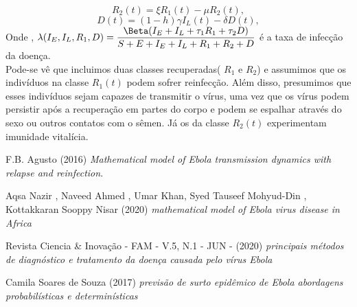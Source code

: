 \documentclass[12pt,a4paper]{article}
\begin{document}
$$R_2(t) = \xi R_1(t) - \mu R_2(t) ,$$
$$D(t) = (1 - h)\gamma I_L(t) - \delta D(t) ,$$
Onde , $\lambda(I_E,I_L,R_1,D) = \dfrac{\Beta (I_E + I_L + \tau_1 R_1 + \tau_2 D)}{S + E + I_E + I_L + R_1 + R_2 + D}$ é a taxa de infecção da doença. \vspace{3mm}\\
Pode-se vê que incluimos duas classes recuperadas( $R_1$ e $R_2$) e assumimos que os indivíduos na classe $R_1(t)$ podem sofrer reinfecção. Além disso, presumimos que esses indivíduos sejam capazes de transmitir o vírus, uma vez que os vírus podem persistir após a recuperação em partes do corpo e podem se espalhar através do sexo ou outros contatos com o sêmen. Já os da classe $R_2(t)$ experimentam imunidade vitalícia.
 
\newpage
\begin{thebibliography}{9}
F.B. Agusto (2016) \emph{Mathematical model of Ebola transmission dynamics with relapse and reinfection}.

Aqsa Nazir , Naveed Ahmed , Umar Khan, Syed Tauseef Mohyud-Din , Kottakkaran Sooppy Nisar (2020) \emph{mathematical model of Ebola virus disease in Africa} 

Revista Ciencia & Inovação - FAM - V.5, N.1 - JUN - (2020) \emph{principais métodos de diagnóstico
e tratamento da doença causada pelo vírus Ebola} 

Camila Soares de Souza (2017) \emph{previsão de surto epidêmico de Ebola abordagens probabilísticas e determinísticas}

\end{thebibliography}
\end{document}
